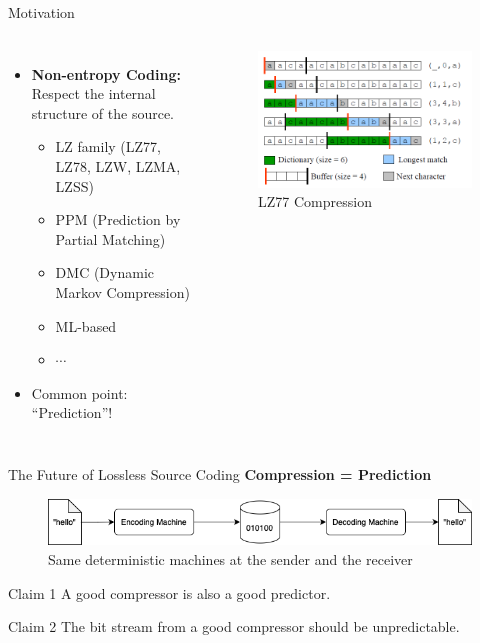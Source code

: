 \documentclass[mathserif, 13pt, aspectratio=1610]{beamer}
\begin{document}
\begin{frame}{Motivation}
	\begin{columns}[T]
		\centering
		\begin{itemize}
			\item \textbf{Non-entropy Coding:} Respect the internal structure of the source.
			\begin{itemize}
				\item LZ family (LZ77, LZ78, LZW, LZMA, LZSS)
				\item PPM (Prediction by Partial Matching)
				\item DMC (Dynamic Markov Compression)
				\item ML-based
				\item $\cdots$
			\end{itemize}
			\item Common point: ``Prediction''!
		\end{itemize}
		\centering
		\begin{figure}[h!]
			\centering
			\includegraphics[width=1.05\textwidth]{lz77.png}
			\caption{LZ77 Compression}
			\label{fig:lz77}
		\end{figure}
	\end{columns}
	
\end{frame}


\begin{frame}{The Future of Lossless Source Coding}
	\textbf{Compression = Prediction}
	\begin{figure}[h!]
		\centering
		\includegraphics[width=\textwidth]{encode-decode-machine.png}
		\caption{Same deterministic machines at the sender and the receiver}
		\label{fig:encode-decode-machine}
	\end{figure}
	\begin{block}{Claim 1}
		A good compressor is also a good predictor.
	\end{block}
	\begin{block}{Claim 2}
		The bit stream from a good compressor should be unpredictable.
	\end{block}

\end{frame}
\end{document}
